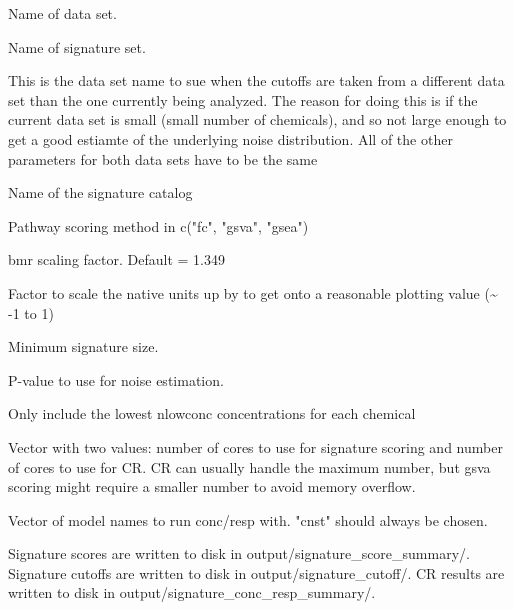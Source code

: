 \documentclass[letterpaper]{book}
\begin{document}
%
\begin{Arguments}
\begin{ldescription}
\item[\code{dataset}] Name of data set.

\item[\code{sigset}] Name of signature set.

\item[\code{cutoff.dataset}] This is the data set name to sue when the cutoffs are taken from a different data set than
the one currently being analyzed. The reason for doing this is if the current data set is small
(small number of chemicals), and so not large enough to get a good estiamte of the underlying
noise distribution. All of the other parameters for both data sets have to be the same

\item[\code{sigcatalog}] Name of the signature catalog

\item[\code{method}] Pathway scoring method in c("fc", "gsva", "gsea")

\item[\code{bmr\_scale}] bmr scaling factor. Default = 1.349

\item[\code{normfactor}] Factor to scale the native units up by to get onto a reasonable plotting value (\textasciitilde{} -1 to 1)

\item[\code{minsigsize}] Minimum signature size.

\item[\code{pval}] P-value to use for noise estimation.

\item[\code{nlowconc}] Only include the lowest nlowconc concentrations for each chemical

\item[\code{mc.cores}] Vector with two values: number of cores to use for signature
scoring and number of cores to use for CR. CR can usually handle the maximum
number, but gsva scoring might require a smaller number to avoid memory
overflow.

\item[\code{fitmodels}] Vector of model names to run conc/resp with. "cnst" should
always be chosen.
\end{ldescription}
\end{Arguments}
%
\begin{Details}\relax
Signature scores are written to disk in output/signature\_score\_summary/.
Signature cutoffs are written to disk in output/signature\_cutoff/.
CR results are written to disk in output/signature\_conc\_resp\_summary/.
\end{Details}
\end{document}
